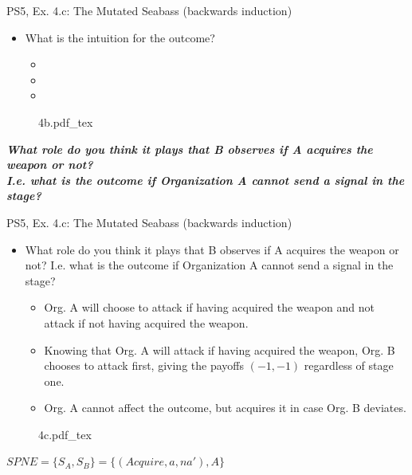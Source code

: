 \begin{frame}{PS5, Ex. 4.c: The Mutated Seabass (backwards induction)}
    \begin{itemize}
      \item[(c)] What is the intuition for the outcome?
      \begin{itemize}\normalsize
        \item[\nth{3} stage:] 
        \item[\nth{2} stage:] 
        \item[\nth{1} stage:] 
      \end{itemize}
    \end{itemize}
    \vspace{-8pt}
    \begin{figure}[!h]
      \center
      \def\svgwidth{\columnwidth}
      {4b.pdf_tex}
    \end{figure}
    \textbf{\textit{What role do you think it plays that B observes if A acquires the weapon or not?\\
    I.e. what is the outcome if Organization A cannot send a signal in the  stage?}}
  \vfill\null
\end{frame}
\begin{frame}{PS5, Ex. 4.c: The Mutated Seabass (backwards induction)}
    \begin{itemize}
      \item[(c)] What role do you think it plays that B observes if A acquires the weapon or not? I.e. what is the outcome if Organization A cannot send a signal in the  stage?
      \begin{itemize}\normalsize
        \item[\nth{3} stage:] [unchanged] Org. A will choose to attack if having acquired the weapon and not attack if not having acquired the weapon.
        \item[\nth{2} stage:] Knowing that Org. A will attack if having acquired the weapon, Org. B chooses to attack first, giving the payoffs $(-1,-1)$ regardless of stage one.
        \item[\nth{1} stage:] Org. A cannot affect the outcome, but acquires it in case Org. B deviates.
      \end{itemize}
    \end{itemize}
    \vspace{-8pt}
    \begin{figure}[!h]
      \center
      \def\svgwidth{\columnwidth}
      {4c.pdf_tex}
    \end{figure}
    \vspace{-2pt}
    $SPNE=\{S_A,S_B\}=\{ (Acquire, a, na'),A \}$
  \vfill\null
\end{frame}
